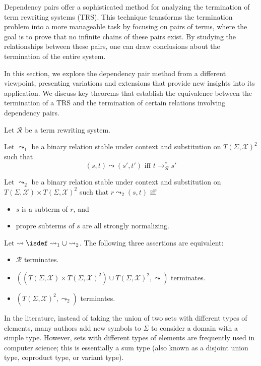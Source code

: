 
Dependency pairs \cite{arts2000termination} offer a sophisticated method for analyzing the termination of term rewriting systems (TRS). This technique transforms the termination problem into a more manageable task by focusing on pairs of terms, where the goal is to prove that no infinite chains of these pairs exist. By studying the relationships between these pairs, one can draw conclusions about the termination of the entire system.

In this section, we explore the dependency pair method from a different viewpoint, presenting variations and extensions that provide new insights into its application. We discuss key theorems that establish the equivalence between the termination of a TRS and the termination of certain relations involving dependency pairs.

\begin{theorem}
Let $\mathcal{R}$ be a term rewriting system. 

Let $\leadsto_1$ be a binary relation stable under context and substitution on $T(\Sigma,\mathcal{X})^2$ such that $$(s,t) \leadsto (s',t') \text{ iff } t \mathop{\to} _\mathcal{R}^* s'$$

Let $\leadsto_2$ be a binary relation stable under context and substitution on $T(\Sigma,\mathcal{X}) \mathop{\times} T(\Sigma,\mathcal{X})^2$ such that $r \leadsto_2 (s,t)$ iff 
\begin{itemize}
    \item $s$ is a subterm of $r$, and
    \item propre subterms of $s$ are all strongly normalizing.
\end{itemize}

Let $\leadsto \isdef \leadsto_1 \mathop{\cup} \leadsto_2$.
The following three assertions are equivalent:
\begin{itemize}
    \item $\mathcal{R}$ terminates.
    \item $((T(\Sigma,\mathcal{X}) \mathop{\times} T(\Sigma,\mathcal{X})^2) \mathop{\cup} T(\Sigma,\mathcal{X})^2, \leadsto)$ terminates.
    \item $(T(\Sigma,\mathcal{X})^2, \leadsto_2)$ terminates.
\end{itemize} 
\end{theorem}

In the literature, instead of taking the union of two sets with different types of elements, many authors add new symbols to $\Sigma$ to consider a domain with a simple type. However, sets with different types of elements are frequently used in computer science; this is essentially a sum type (also known as a disjoint union type, coproduct type, or variant type).


